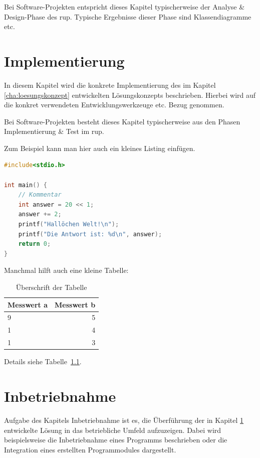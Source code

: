 \documentclass[oneside]{ausarbeitung}
\begin{document}
Bei Software-Projekten entspricht dieses Kapitel typischerweise der 
Analyse \& Design-Phase des \ac{rup}. Typische Ergebnisse dieser Phase sind 
Klassendiagramme etc.

\chapter{Implementierung}
\label{cha:implementierung}

In diesem Kapitel wird die konkrete Implementierung des im Kapitel
\ref{cha:loesungskonzept} entwickelten Lösungskonzepts beschrieben.
Hierbei wird auf die konkret verwendeten Entwicklungswerkzeuge etc. 
Bezug genommen.

Bei Software-Projekten besteht dieses Kapitel typischerweise aus den 
Phasen Implementierung \& Test im \ac{rup}.

Zum Beispiel kann man hier auch ein kleines Listing einfügen.

\begin{lstlisting}[language=c,%
                   caption={Überschrift des Quelltexts}]
#include<stdio.h>

int main() {
    // Kommentar
    int answer = 20 << 1;
    answer += 2;
    printf("Hallöchen Welt!\n");
    printf("Die Antwort ist: %d\n", answer);
    return 0;
}
\end{lstlisting}

Manchmal hilft auch eine kleine Tabelle:

\begin{table}[htbp]
\centering
\begin{tabular}{|l|r|}
\hline
\textbf{Messwert a} & \textbf{Messwert b} \\ \hline
9 & 5 \\ \hline
1 & 4 \\ \hline
1 & 3 \\ \hline
\end{tabular}
\caption{Überschrift der Tabelle}
\label{tab:my-table}
\end{table}

Details siehe Tabelle~\ref{tab:my-table}.
\chapter{Inbetriebnahme}
\label{cha:inbetriebnahme}

Aufgabe des Kapitels Inbetriebnahme ist es, die Überführung der in 
Kapitel \ref{cha:implementierung} entwickelte Lösung in das betriebliche 
Umfeld aufzuzeigen. Dabei wird beispielsweise die Inbetriebnahme eines 
Programms beschrieben oder die Integration eines erstellten 
Programmodules dargestellt.
\end{document}
